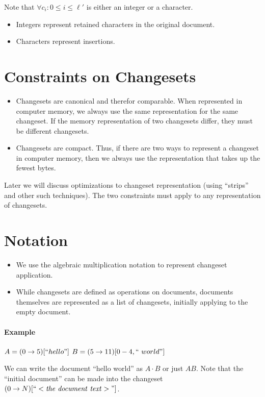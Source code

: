 \documentclass{article}
\begin{document}
Note that $\forall c_i : 0 \leq i \leq \ell'$ is either an integer or a character.

\begin{itemize}
\item Integers represent retained characters in the original document.
\item Characters represent insertions.
\end{itemize}

\section{Constraints on Changesets}

\begin{itemize}
\item Changesets are canonical and therefor comparable.  When represented in computer memory, we always use the same representation for the same changeset.  If the memory representation of two changesets differ, they must be different changesets.
\item Changesets are compact.  Thus, if there are two ways to represent a changeset in computer memory, then we always use the representation that takes up the fewest bytes.
\end{itemize}

Later we will discuss optimizations to changeset
representation (using ``strips'' and other such
techniques).  The two constraints must apply to any
representation of changesets.

\section{Notation}

\begin{itemize}
\item We use the algebraic multiplication notation to represent changeset application.
\item While changesets are defined as operations on documents, documents themselves are represented as a list of changesets, initially applying to the empty document.
\end{itemize}

\paragraph{Example}
$A=(0\rightarrow 5)[``hello"]$
$B=(5\rightarrow 11)[0-4, ``\ world"]$

We can write the document ``hello world'' as $A\cdot B$ or
just $AB$.  Note that the ``initial document'' can be made
into the changeset $(0\rightarrow
N)[``<\mathit{the\ document\ text}>"]$.
\end{document}
